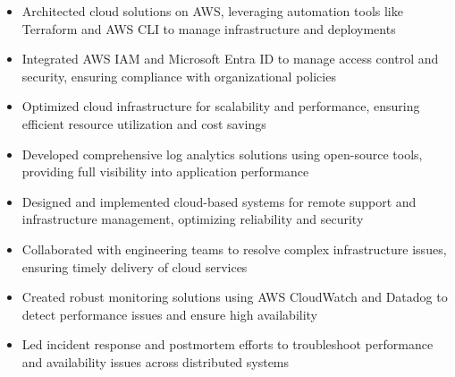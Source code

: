 \par\smallskip
\begin{minipage}{13.75cm}
  \begin{minipage}{6.5cm}
    \begin{itemize}
      \item Architected cloud solutions on AWS, leveraging automation tools like Terraform and AWS CLI to manage infrastructure and deployments
      \item Integrated AWS IAM and Microsoft Entra ID to manage access control and security, ensuring compliance with organizational policies
    \end{itemize}
  \end{minipage}
  \hfill
  \begin{minipage}{6.5cm}
    \begin{itemize}
      \item Optimized cloud infrastructure for scalability and performance, ensuring efficient resource utilization and cost savings
      \item Developed comprehensive log analytics solutions using open-source tools, providing full visibility into application performance
    \end{itemize}
  \end{minipage}
\end{minipage}
\par\smallskip
\divider

\par\smallskip
\begin{minipage}{13.75cm}
  \begin{minipage}{6.5cm}
    \begin{itemize}
      \item Designed and implemented cloud-based systems for remote support and infrastructure management, optimizing reliability and security
      \item Collaborated with engineering teams to resolve complex infrastructure issues, ensuring timely delivery of cloud services
    \end{itemize}
  \end{minipage}
  \hfill
  \begin{minipage}{6.5cm}
    \begin{itemize}
      \item Created robust monitoring solutions using AWS CloudWatch and Datadog to detect performance issues and ensure high availability
      \item Led incident response and postmortem efforts to troubleshoot performance and availability issues across distributed systems
    \end{itemize}
  \end{minipage}
\end{minipage}

